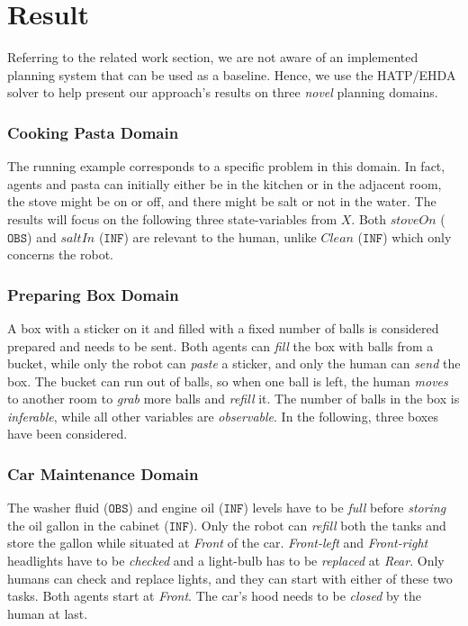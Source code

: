 {%
\section{Result}

Referring to the related work section, we are not aware of an implemented planning system that can be used as a baseline. Hence, we use the HATP/EHDA solver to help present our approach's results on three \textit{novel} planning domains.

\subsubsection{Cooking Pasta Domain}
The running example corresponds to a specific problem in this domain. In fact, agents and pasta can initially either be in the kitchen or in the adjacent room, the stove might be on or off, and there might be salt or not in the water.  
The results will focus on the following three state-variables from $X$. Both $stoveOn$ ($\texttt{OBS}$) and $saltIn$ ($\texttt{INF}$) are relevant to the human, unlike $Clean$ ($\texttt{INF}$) which only concerns the robot. 

\subsubsection{Preparing Box Domain}
A box with a sticker on it and filled with a fixed number of balls is considered prepared and needs to be sent. Both agents can \textit{fill} the box with balls from a bucket, while only the robot can \textit{paste} a sticker, and only the human can \textit{send} the box. The bucket can run out of balls, so when one ball is left, the human \textit{moves} to another room to \textit{grab} more balls and \textit{refill} it. 
The number of balls in the box is \textit{inferable}, while all other variables are {\em observable}. 
In the following, three boxes have been considered.

\subsubsection{Car Maintenance Domain}
The washer fluid ($\texttt{OBS}$) and engine oil ($\texttt{INF}$) levels have to be \textit{full} before \textit{storing} the oil gallon in the cabinet ($\texttt{INF}$). 
Only the robot can \textit{refill} both the tanks and store the gallon while situated at \textit{Front} of the car. 
\textit{Front-left} and \textit{Front-right} headlights have to be \textit{checked} and a light-bulb has to be \textit{replaced} at \textit{Rear}. 
Only humans can check and replace lights, and they can start with either of these two tasks.
Both agents start at \textit{Front}.
The car's hood needs to be \textit{closed} by the human at last.

}
